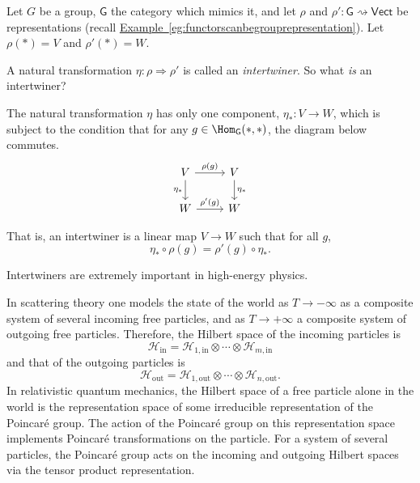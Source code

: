 \documentclass[notes.tex]{subfiles}
\begin{document}
\begin{example}
  \label{eg:intertwinersarenaturaltransformations}
  Let $G$ be a group, $\mathsf{G}$ the category which mimics it, and let $\rho$ and $\rho'\colon \mathsf{G} \rightsquigarrow \mathsf{Vect}$ be representations (recall \hyperref[eg:functorscanbegrouprepresentation]{Example~\ref*{eg:functorscanbegrouprepresentation}}). Let $\rho(*) = V$ and $\rho'(*) = W$.

  A natural transformation $\eta\colon \rho \Rightarrow \rho'$ is called an \emph{intertwiner}. So what \emph{is} an intertwiner?

  The natural transformation $\eta$ has only one component, $\eta_{*}\colon V \to W$, which is subject to the condition that for any $g \in \Hom_{\mathsf{G}}(*,*)$, the diagram below commutes.
  \begin{equation*}
    \begin{tikzcd}
      V
      \arrow[r, "\rho(g)"]
      \arrow[d, swap, "\eta_{*}"]
      & V
      \arrow[d, "\eta_{*}"]
      \\
      W
      \arrow[r, "\rho'(g)"]
      & W
    \end{tikzcd}
  \end{equation*}

  That is, an intertwiner is a linear map $V \to W$ such that for all $g$,
  \begin{equation*}
    \eta_{*} \circ \rho(g) = \rho'(g) \circ \eta_{*}.
  \end{equation*}

  Intertwiners are extremely important in high-energy physics.

  In scattering theory one models the state of the world as $T \to - \infty$ as a composite system of several incoming free particles, and as $T \to +\infty$ a composite system of outgoing free particles. Therefore, the Hilbert space of the incoming particles is
  \begin{equation*}
    \mathscr{H}_{\mathrm{in}} = \mathscr{H}_{1, \mathrm{in}} \otimes \cdots \otimes \mathscr{H}_{m, \mathrm{in}}
  \end{equation*}
  and that of the outgoing particles is
  \begin{equation*}
    \mathscr{H}_{\mathrm{out}} = \mathscr{H}_{1, \mathrm{out}} \otimes \cdots \otimes \mathscr{H}_{n, \mathrm{out}}.
  \end{equation*}
  In relativistic quantum mechanics, the Hilbert space of a free particle alone in the world is the representation space of some irreducible representation of the Poincaré group. The action of the Poincaré group on this representation space implements Poincaré transformations on the particle. For a system of several particles, the Poincaré group acts on the incoming and outgoing Hilbert spaces via the tensor product representation.


\end{example}
\end{document}
